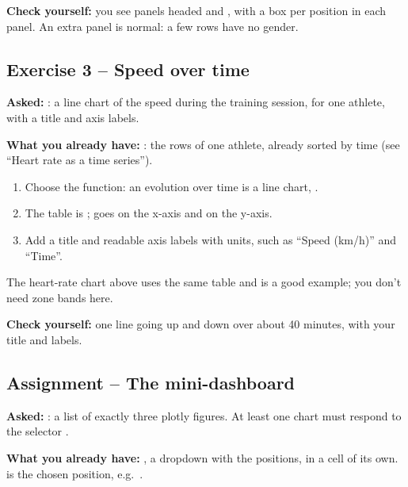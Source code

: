 \documentclass[11pt,a4paper]{article}
\begin{document}
\textbf{Check yourself:} you see panels headed  and
, with a box per position in each panel. An extra panel
 is normal: a few rows have no gender.

\subsection*{Exercise 3 -- Speed over time}

\textbf{Asked:} : a line chart of the speed during the
training session, for one athlete, with a title and axis labels.

\textbf{What you already have:} : the rows of one
athlete, already sorted by time (see ``Heart rate as a time series'').

\begin{enumerate}
  \item Choose the function: an evolution over time is a line chart,
        .
  \item The table is ;  goes on the
        x-axis and  on the y-axis.
  \item Add a title and readable axis labels with units, such as ``Speed
        (km/h)'' and ``Time''.
\end{enumerate}

The heart-rate chart above uses the same table and is a good example; you
don't need zone bands here.

\textbf{Check yourself:} one line going up and down over about 40 minutes,
with your title and labels.

\subsection*{Assignment -- The mini-dashboard}

\textbf{Asked:} : a list of exactly three plotly
figures. At least one chart must respond to the selector
.

\textbf{What you already have:} , a dropdown with
the positions, in a cell of its own.  is
the chosen position, e.g.\ .
\end{document}
